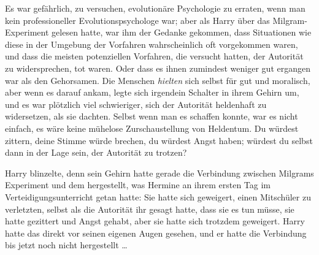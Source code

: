 Es war gefährlich, zu versuchen, evolutionäre Psychologie zu erraten, wenn man kein professioneller Evolutionspsychologe war; aber als Harry über das Milgram-Experiment gelesen hatte, war ihm der Gedanke gekommen, dass Situationen wie diese in der Umgebung der Vorfahren wahrscheinlich oft vorgekommen waren, und dass die meisten potenziellen Vorfahren, die versucht hatten, der Autorität zu widersprechen, tot waren. Oder dass es ihnen zumindest weniger gut ergangen war als den Gehorsamen. Die Menschen \emph{hielten} sich selbst für gut und moralisch, aber wenn es darauf ankam, legte sich irgendein Schalter in ihrem Gehirn um, und es war plötzlich viel schwieriger, sich der Autorität heldenhaft zu widersetzen, als sie dachten. Selbst wenn man es schaffen konnte, war es nicht einfach, es wäre keine mühelose Zurschaustellung von Heldentum. Du würdest zittern, deine Stimme würde brechen, du würdest Angst haben; würdest du selbst dann in der Lage sein, der Autorität zu trotzen?

Harry blinzelte, denn sein Gehirn hatte gerade die Verbindung zwischen Milgrams Experiment und dem hergestellt, was Hermine an ihrem ersten Tag im Verteidigungsunterricht getan hatte: Sie hatte sich geweigert, einen Mitschüler zu verletzten, selbst als die Autorität ihr gesagt hatte, dass sie es tun müsse, sie hatte gezittert und Angst gehabt, aber sie hatte sich trotzdem geweigert. Harry hatte das direkt vor seinen eigenen Augen gesehen, und er hatte die Verbindung bis jetzt noch nicht hergestellt …

